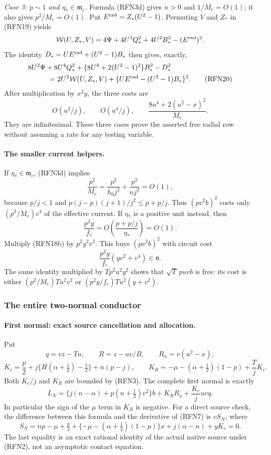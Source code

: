 \emph{Case 3: $p\sim1$ and $\eta_*\in\mathfrak m_c$.}
Formula (RFN3d) gives $n>0$ and $1/M_e=O(1)$; it also gives
$p^2/M_e=O(1)$.  Put $E^{\rm rad}=Z_*(U^2-1)$.
Permuting $V$ and $Z_*$ in (RFN19) yields
\[
 \mathcal W(U,Z_*,V)
   =4\Psi+4U^2Q_*^2+4U^2B_*^2-(E^{\rm rad})^2.
\]
The identity $D_*=UE^{\rm rad}+(U^2-1)B_*$ then gives, exactly,
\begin{align}
 &8U^2\Psi+8U^4Q_*^2+
   \{8U^4+2(U^2-1)^2\}B_*^2-D_*^2\\
 &\hspace{10mm}=2U^2\mathcal W(U,Z_*,V)
                 +\{UE^{\rm rad}-(U^2-1)B_*\}^2.        \tag{RFN20}
\end{align}
After multiplication by $x^2y$, the three costs are
\[
 O(u^2/j),\qquad O(u^4/j),\qquad
 \frac{8u^4+2(u^2-x)^2}{M_e}.
\]
They are infinitesimal.  These three cases prove the asserted free
radial row without assuming a rate for any testing variable.

\paragraph{The smaller current helpers.}
If $\eta_*\in\mathfrak m_c$, (RFN3d) implies
\[
 \frac{p^2}{M_e}
 =\frac{p^2}{h_0j^2}+\frac{p^2}{nj^2}=O(1),
\]
because $p/j<1$ and
$p(j-p)(j+1)/j^2\leq p+p/j$.
Thus $(pv^2b)^2$ costs only $(p^2/M_e)v^4$ of the effective current.
If $\eta_*$ is a positive unit instead, then
\[
 \frac{p^2y}{f_c}=O\!\left(\frac{p+p/j}{\eta_*}\right)=O(1).
\]
Multiply (RFN18b) by $p^2y^2v^2$.  This buys $(pv^2b)^2$ with circuit
cost
\[
 \frac{p^2y}{f_c}(yv^2+v^4)\in\mathfrak n.
\]
The same identity multiplied by $Tp^2u^2y^2$ shows that
$\sqrt T\,puvb$ is free: its cost is either
$(p^2/M_e)Tu^2v^2$ or
$(p^2y/f_c)Tu^2(y+v^2)$.

\subsubsection*{The entire two-normal conductor}

\paragraph{First normal: exact source cancellation and allocation.}
Put
\[
 q=vz-Tu,\qquad R=z-uv/B,\qquad R_u=v(u^2-x),
\]
\[
 K_c=\frac p2+j\{H(\alpha+\tfrac12)-\tfrac12\}+n(p-j),
 \qquad
 K_R=-\mu-(\alpha+\tfrac12)(1-p)+\frac TjK_c.
\]
Both $K_c/j$ and $K_R$ are bounded by (RFN3).  The complete first normal
is exactly
\[
 L_N=\{j(n-\alpha)+p(n+\tfrac12)v^2\}b
                  +K_RR_u+\frac{K_c}{j}uvq.            \tag{RFN21}
\]
In particular the sign of the $\mu$ term in $K_R$ is negative.
For a direct source check, the difference between this formula and
the derivative of (RFN7) is $vS_N$, where
\[
 S_N=np-\mu+\tfrac p2+
       \{-\mu-(\alpha+\tfrac12)(1-p)\}x
       +j(\alpha-n)+yK_c=0.
\]
The last equality is an exact rational identity of the actual native
source under (RFN2), not an asymptotic contact equation.

